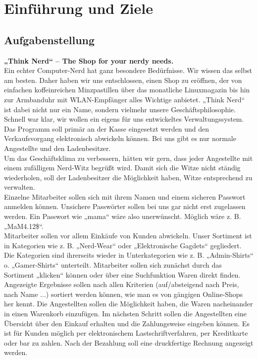 \documentclass[pdftex,12pt,a4paper]{article}
\begin{document}
\newcommand{\half}{0.5\textwidth}
\newcommand{\third}{0.3\textwidth}



\tableofcontents
\newpage

\section{Einf\"uhrung und Ziele}

\subsection{Aufgabenstellung} 
\textbf{„Think Nerd“ – The Shop for your nerdy needs.}\\[.25cm]
Ein echter Computer-Nerd hat ganz besondere Bedürfnisse. Wir wissen das selbst am besten. Daher haben wir uns entschlossen, einen Shop zu eröffnen, der von einfachen koffeinreichen Minzpastillen über das monatliche Linuxmagazin bis hin zur Armbanduhr mit WLAN-Empfänger alles Wichtige anbietet. „Think Nerd“ ist dabei nicht nur ein Name, sondern vielmehr unsere Geschäftsphilosophie. Schnell war klar, wir wollen ein eigens für uns entwickeltes Verwaltungssystem. Das Programm soll primär an der Kasse eingesetzt werden und den Verkaufsvorgang elektronisch abwickeln können. Bei uns gibt es nur normale Angestellte und den Ladenbesitzer.\\
Um das Geschäftsklima zu verbessern, hätten wir gern, dass jeder Angestellte mit einem zufälligem Nerd-Witz begrüßt wird. Damit sich die Witze nicht ständig wiederholen, soll der Ladenbesitzer die Möglichkeit haben, Witze entsprechend zu verwalten.\\
Einzelne Mitarbeiter sollen sich mit ihrem Namen und einem sicheren Passwort anmelden können. Unsichere Passwörter sollen bei uns gar nicht erst zugelassen werden. Ein Passwort wie „mama“ wäre also unerwünscht. Möglich wäre z. B. „MaM4.12\$“.\\
Mitarbeiter sollen vor allem Einkäufe von Kunden abwickeln. Unser Sortiment ist in Kategorien wie z. B. „Nerd-Wear“ oder „Elektronische Gagdets“ gegliedert. Die Kategorien sind ihrerseits wieder in Unterkategorien wie z. B. „Admin-Shirts“ o. „Gamer-Shirts“ unterteilt. Mitarbeiter sollen sich zunächst durch das Sortiment „klicken“ können oder über eine Suchfunktion Waren direkt finden. Angezeigte Ergebnisse sollen nach allen Kriterien (auf/absteigend nach Preis, nach Name ...) sortiert werden können, wie man es von gängigen Online-Shops her kennt. Die Angestellten sollen die Möglichkeit haben, die Waren nacheinander in einen Warenkorb einzufügen. Im nächsten Schritt sollen die Angestellten eine Übersicht über den Einkauf erhalten und die Zahlungsweise eingeben können. Es ist für Kunden möglich per elektronischem Lastschriftverfahren, per Kreditkarte oder bar zu zahlen. Nach der Bezahlung soll eine druckfertige Rechnung angezeigt werden.\\
\end{document}
